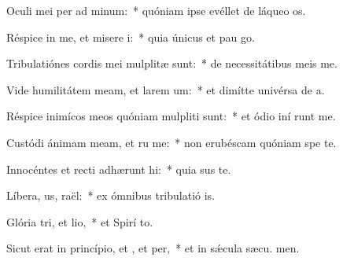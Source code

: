 \item Oculi mei per ad minum:~* quóniam ipse evéllet de láqueo  os.
\item Réspice in me, et misere i:~* quia únicus et pau  go.
\item Tribulatiónes cordis mei mulplitæ sunt:~* de necessitátibus meis  me.
\item Vide humilitátem meam, et larem um:~* et dimítte univérsa de a.
\item Réspice inimícos meos quóniam mulpliti sunt:~* et ódio iní runt me.
\item Custódi ánimam meam, et ru me:~* non erubéscam quóniam spe  te.
\item Innocéntes et recti adhærunt hi:~* quia sus te.
\item Líbera, us, raël:~* ex ómnibus tribulatió is.
\item Glória tri, et lio,~* et Spirí to.
\item Sicut erat in princípio, et , et per,~* et in sǽcula sæcu. men.
